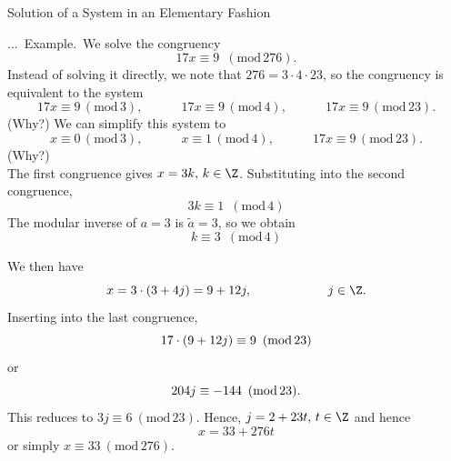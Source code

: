 \documentclass[smaller,hyperref={CJKbookmarks=true}]{beamer}
\newcounter{zhuo}[subsection]
\renewcommand{\thezhuo}{\thesection.\thesubsection.\arabic{zhuo}}
\newenvironment{EXAMPLE}{\stepcounter{zhuo}\alert{\!\thezhuo.~Example.\,}}{}
\begin{document}
\begin{frame}{Solution of a System in an Elementary Fashion}
\begin{spacing}{0.85}
\begin{EXAMPLE}
We solve the congruency
\[17x\equiv9\enspace(\text{mod}\,276).\]
Instead of solving it directly, we note that $276=3\cdot4\cdot23$, so the congruency is equivalent to the system
\[17x\equiv9\,(\text{mod}\,3),\qquad\quad
17x\equiv9\,(\text{mod}\,4),\qquad\quad
17x\equiv9\,(\text{mod}\,23).\]
(Why?) We can simplify this system to
\[x\equiv0\,(\text{mod}\,3),\qquad\quad
x\equiv1\,(\text{mod}\,4),\qquad\quad
17x\equiv9\,(\text{mod}\,23).\]
(Why?)\\[2pt]
The first congruence gives $x=3k,\,k\in\Z$. Substituting into the second congruence,
\[3k\equiv1\enspace(\text{mod}\,4)\]
The modular inverse of $a=3$ is $\widetilde{a}=3$, so we obtain
\[k\equiv3\enspace(\text{mod}\,4)\]
\end{EXAMPLE}
\end{spacing}
\begin{spacing}{1}
We then have
\[x=3\cdot(3+4j)=9+12j,\qquad\qquad\qquad
j\in\Z.\]
Inserting into the last congruence,
\[17\cdot(9+12j)\equiv9\enskip(\text{mod}\,23)\]
or
\[204j\equiv-144\enskip(\text{mod}\,23).\]
This reduces to $3j\equiv6~(\text{mod}\,23)$. Hence, $j=2+23t,\,t\in\Z$ and hence
\[x=33+276t\]
or simply $x\equiv33~(\text{mod}\,276)$.
\end{spacing}
\end{frame}
\end{document}
